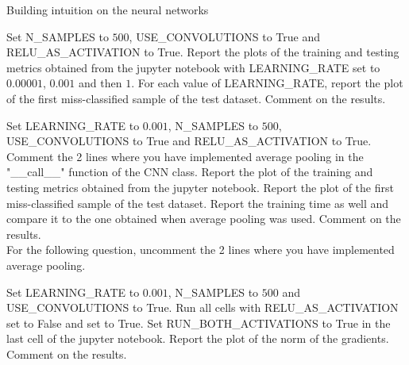 \documentclass[
	ngerman,
	points=true,%
    solution=true,
    accentcolor=9c,
    colorbacktitle
	]{tudaexercise}
\begin{document}
\begin{task}{Building intuition on the neural networks}
\begin{solution}
\end{solution}

\begin{subtask}
    Set N\_SAMPLES to $500$, USE\_CONVOLUTIONS to True and RELU\_AS\_ACTIVATION to True. Report the plots of the training and testing metrics obtained from the jupyter notebook with LEARNING\_RATE set to $0.00001$, $0.001$ and then $1$. For each value of LEARNING\_RATE, report the plot of the first miss-classified sample of the test dataset. Comment on the results.
\end{subtask}
\begin{solution}

\end{solution}

\begin{subtask}
    Set LEARNING\_RATE to $0.001$, N\_SAMPLES to $500$, USE\_CONVOLUTIONS to True and RELU\_AS\_ACTIVATION to True. Comment the 2 lines where you have implemented average pooling in the "\_\_call\_\_" function of the CNN class. Report the plot of the training and testing metrics obtained from the jupyter notebook. Report the plot of the first miss-classified sample of the test dataset. Report the training time as well and compare it to the one obtained when average pooling was used. Comment on the results.\\
    For the following question, uncomment the 2 lines where you have implemented average pooling. 
\end{subtask}
\begin{solution}

\end{solution}

\begin{subtask}
    Set LEARNING\_RATE to $0.001$, N\_SAMPLES to $500$ and USE\_CONVOLUTIONS to True. Run all cells with RELU\_AS\_ACTIVATION set to False and set to True. Set RUN\_BOTH\_ACTIVATIONS to True in the last cell of the jupyter notebook. Report the plot of the norm of the gradients. Comment on the results.
\end{subtask}
\begin{solution}

\end{solution}
\end{task}
\end{document}
